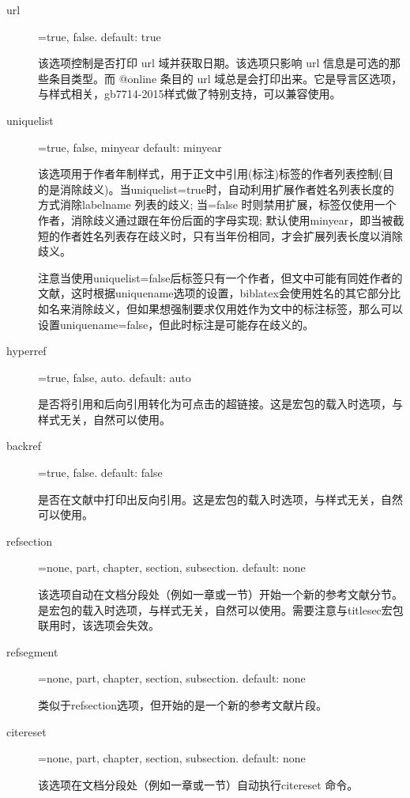 \begin{description}
  \item[url]=true, false. \hfill default: true

  该选项控制是否打印 url 域并获取日期。该选项只影响 url 信息是可选的那些条目类型。而 @online 条目的 url 域总是会打印出来。它是导言区选项，与样式相关，gb7714-2015样式做了特别支持，可以兼容使用。

  \item[uniquelist]=true, false, minyear \hfill default: minyear

  该选项用于作者年制样式，用于正文中引用(标注)标签的作者列表控制(目的是消除歧义)。当uniquelist=true时，自动利用扩展作者姓名列表长度的方式消除labelname 列表的歧义; 当=false 时则禁用扩展，标签仅使用一个作者，消除歧义通过跟在年份后面的字母实现; 默认使用minyear，即当被截短的作者姓名列表存在歧义时，只有当年份相同，才会扩展列表长度以消除歧义。

  注意当使用uniquelist=false后标签只有一个作者，但文中可能有同姓作者的文献，这时根据uniquename选项的设置，biblatex会使用姓名的其它部分比如名来消除歧义，但如果想强制要求仅用姓作为文中的标注标签，那么可以设置uniquename=false，但此时标注是可能存在歧义的。

  \item[hyperref]=true, false, auto. \hfill default: auto

  是否将引用和后向引用转化为可点击的超链接。这是宏包的载入时选项，与样式无关，自然可以使用。

  \item[backref]=true, false. \hfill default: false

  是否在文献中打印出反向引用。这是宏包的载入时选项，与样式无关，自然可以使用。

  \item[refsection]=none, part, chapter, section, subsection. \hfill default: none

  该选项自动在文档分段处（例如一章或一节）开始一个新的参考文献分节。是宏包的载入时选项，与样式无关，自然可以使用。需要注意与titlesec宏包联用时，该选项会失效。

  \item[refsegment]=none, part, chapter, section, subsection. \hfill default: none

  类似于refsection选项，但开始的是一个新的参考文献片段。

  \item[citereset]=none, part, chapter, section, subsection. \hfill default: none

  该选项在文档分段处（例如一章或一节）自动执行citereset 命令。


\end{description}
